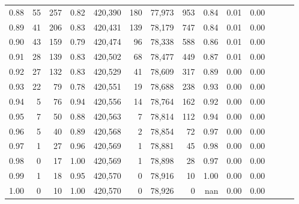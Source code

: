 \begin{tabular}{rrrrrrrrrrrrrr}
0.88 &      55 &    257 &  0.82 &  420,390 &      180 &  77,973 &     953 &  0.84 &  0.01 &      0.00 \\
0.89 &      41 &    206 &  0.83 &  420,431 &      139 &  78,179 &     747 &  0.84 &  0.01 &      0.00 \\
0.90 &      43 &    159 &  0.79 &  420,474 &       96 &  78,338 &     588 &  0.86 &  0.01 &      0.00 \\
0.91 &      28 &    139 &  0.83 &  420,502 &       68 &  78,477 &     449 &  0.87 &  0.01 &      0.00 \\
0.92 &      27 &    132 &  0.83 &  420,529 &       41 &  78,609 &     317 &  0.89 &  0.00 &      0.00 \\
0.93 &      22 &     79 &  0.78 &  420,551 &       19 &  78,688 &     238 &  0.93 &  0.00 &      0.00 \\
0.94 &       5 &     76 &  0.94 &  420,556 &       14 &  78,764 &     162 &  0.92 &  0.00 &      0.00 \\
0.95 &       7 &     50 &  0.88 &  420,563 &        7 &  78,814 &     112 &  0.94 &  0.00 &      0.00 \\
0.96 &       5 &     40 &  0.89 &  420,568 &        2 &  78,854 &      72 &  0.97 &  0.00 &      0.00 \\
0.97 &       1 &     27 &  0.96 &  420,569 &        1 &  78,881 &      45 &  0.98 &  0.00 &      0.00 \\
0.98 &       0 &     17 &  1.00 &  420,569 &        1 &  78,898 &      28 &  0.97 &  0.00 &      0.00 \\
0.99 &       1 &     18 &  0.95 &  420,570 &        0 &  78,916 &      10 &  1.00 &  0.00 &      0.00 \\
1.00 &       0 &     10 &  1.00 &  420,570 &        0 &  78,926 &       0 &   nan &  0.00 &      0.00 \\
\bottomrule
\end{tabular}
